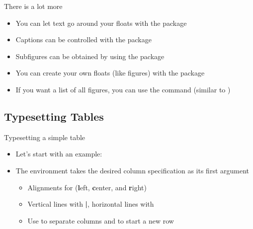 \begin{frame}{There is a lot more}
   \begin{itemize}
      \itemsep8pt
      \item You can let text go around your floats with the  package
      \item Captions can be controlled with the  package
      \item Subfigures can be obtained by using the  package
      \item You can create your own floats (like figures) with the  package
      \item If you want a list of all figures, you can use the \blatex{\\listoffigures} command (similar to \blatex{\\tableofcontents})
   \end{itemize}
\end{frame}

\subsection{Typesetting Tables}


\begin{frame}{Typesetting a simple table}
   \begin{itemize}
      \item Let's start with an example:
      \soldisablenumhl{}
      \item The  environment takes the desired column specification as its first argument \begin{itemize}
         \item Alignments for (\textbf{l}eft, \textbf{c}enter, and \textbf{r}ight)
         \item Vertical lines with \textbf{|}, horizontal lines with \blatex{\\hline}
         \item Use \blatex{\&} to separate columns and \blatex{\\\\} to start a new row
      \end{itemize}
   \end{itemize}
\end{frame}

